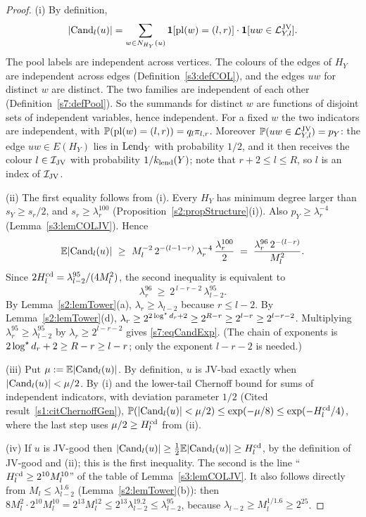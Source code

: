 \begin{proof}
(i) By definition,
\[
|\mathrm{Cand}_l(u)|=\sum_{w\in N_{H_Y}(u)}\mathbf{1}[\mathrm{pl}(w)=(l,r)]\cdot\mathbf{1}[uw\in\mathcal{L}^{\mathrm{JV}}_{Y,l}] .
\]
The pool labels are independent across vertices. The colours of the edges of
$H_Y$ are independent across edges (Definition~\ref{s3:defCOL}), and the edges
$uw$ for distinct $w$ are distinct. The two families are independent of each
other (Definition~\ref{s7:defPool}). So the summands for distinct $w$ are
functions of disjoint sets of independent variables, hence independent. For a
fixed $w$ the two indicators are independent, with
$\mathbb{P}(\mathrm{pl}(w)=(l,r))=q_l\pi_{l,r}$. Moreover $\mathbb{P}(uw\in\mathcal{L}^{\mathrm{JV}}_{Y,l})=p_Y$: the
edge $uw\in E(H_Y)$ lies in $\mathrm{Lend}_Y$ with probability $1/2$, and it then
receives the colour $l\in\mathcal{I}_{\mathrm{JV}}$ with probability $1/k_{\mathrm{lend}}(Y)$; note that
$r+2\le l\le R$, so $l$ is an index of $\mathcal{I}_{\mathrm{JV}}$.

(ii) The first equality follows from (i). Every $H_Y$ has minimum degree larger
than $s_Y\ge s_r/2$, and $s_r\ge\lambda_r^{100}$
(Proposition~\ref{s2:propStructure}(i)). Also $p_Y\ge\lambda_r^{-4}$
(Lemma~\ref{s3:lemCOLJV}). Hence
\[
\Ex|\Cand_l(u)|\ \ge\ M_l^{-2}\,2^{-(l-1-r)}\,\lambda_r^{-4}\,\frac{\lambda_r^{100}}{2}
\;=\;\frac{\lambda_r^{96}\,2^{-(l-r)}}{M_l^{2}} .
\]
Since $2H^{\mathrm{cd}}_l=\lambda_{l-2}^{95}/(4M_l^2)$, the second inequality is equivalent
to
\begin{equation}\label{s7:eqCandExp}
\lambda_r^{96}\ \ge\ 2^{\,l-r-2}\,\lambda_{l-2}^{95}.
\end{equation}
By Lemma~\ref{s2:lemTower}(a), $\lambda_r\ge\lambda_{l-2}$ because $r\le l-2$.
By Lemma~\ref{s2:lemTower}(d),
$\lambda_r\ge2^{2\log^{\star} d_r+2}\ge2^{R-r}\ge2^{l-r}\ge2^{l-r-2}$. Multiplying
$\lambda_r^{95}\ge\lambda_{l-2}^{95}$ by $\lambda_r\ge2^{l-r-2}$ gives
\eqref{s7:eqCandExp}. (The chain of exponents is
$2\log^{\star} d_r+2\ge R-r\ge l-r$; only the exponent $l-r-2$ is needed.)

(iii) Put $\mu\mathrel{:=}\mathbb{E}|\mathrm{Cand}_l(u)|$. By definition, $u$ is JV-bad exactly
when $|\mathrm{Cand}_l(u)|<\mu/2$. By (i) and the lower-tail Chernoff
bound for sums of independent indicators, with deviation parameter $1/2$
(Cited result~\ref{s1:citChernoffGen}),
$\mathbb{P}(|\mathrm{Cand}_l(u)|<\mu/2)\le\exp(-\mu/8)\le\exp(-H^{\mathrm{cd}}_l/4)$, where the last
step uses $\mu/2\ge H^{\mathrm{cd}}_l$ from (ii).

(iv) If $u$ is JV-good then $|\mathrm{Cand}_l(u)|\ge\tfrac12\mathbb{E}|\mathrm{Cand}_l(u)|\ge H^{\mathrm{cd}}_l$,
by the definition of JV-good and (ii); this is the first inequality. The second
is the line
``$H^{\mathrm{cd}}_l\ge2^{10}M_l^{10}$'' of the table of Lemma~\ref{s3:lemCOLJV}. It also
follows directly from $M_l\le\lambda_{l-2}^{1.6}$
(Lemma~\ref{s2:lemTower}(b)): then
$8M_l^2\cdot2^{10}M_l^{10}=2^{13}M_l^{12}\le2^{13}\lambda_{l-2}^{19.2}\le\lambda_{l-2}^{95}$,
because $\lambda_{l-2}\ge M_l^{1/1.6}\ge2^{25}$.
\end{proof}

